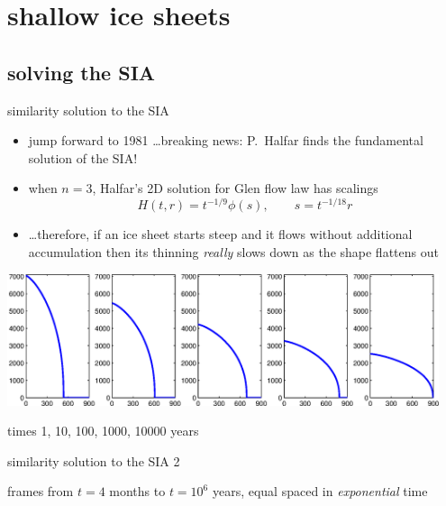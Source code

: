 
\section{shallow ice sheets}

\subsection{solving the SIA}

\begin{frame}{similarity solution to the SIA}

\begin{itemize}
\item jump forward to 1981 \dots breaking news: \quad P.~Halfar finds the fundamental solution of the SIA! \quad [Halfar, 1981; 1983]
\item when $n=3$, Halfar's 2D solution for Glen flow law has scalings
   $$H(t,r)=t^{-1/9} \phi(s), \qquad s = t^{-1/18} r$$
\item \dots therefore, if an ice sheet starts steep and it flows without additional accumulation then its thinning \emph{really} slows down as the shape flattens out
\end{itemize}

\medskip
\begin{center}
\includegraphics[width=0.95\textwidth]{pdffigs/siascaling}

\medskip
\scriptsize times 1, 10, 100, 1000, 10000 years
\end{center}
\end{frame}


\begin{frame}{similarity solution to the SIA 2}
\label{slide:plothalfar}


\par
\scriptsize 
frames from $t=4$ months to $t = 10^6$ years, equal spaced in \emph{exponential} time
\end{frame}


